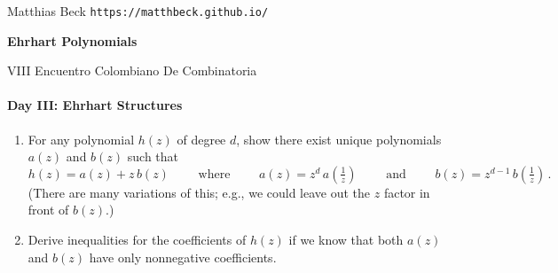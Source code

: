 \documentclass[11pt]{article}
\begin{document}

{\sc Matthias Beck} \hfill {\tt https://matthbeck.github.io/}


\newpage
\begin{center}
\Large{\bf Ehrhart Polynomials} 

\normalsize
VIII Encuentro Colombiano De Combinatoria
\end{center}

\paragraph{Day III: Ehrhart Structures}

\begin{enumerate}[(1)]
\vspace{-10pt}
\item For any polynomial $h(z)$ of degree $d$, show there exist unique polynomials $a(z)$ and $b(z)$ such that
\[
  h(z) = a(z) + z \, b(z)
  \qquad \text{ where } \qquad a(z) = z^d \, a(\tfrac 1 z) \qquad \text{ and } \qquad b(z) = z^{ d-1 } \, b(\tfrac 1 z) \, .
\]
(There are many variations of this; e.g., we could leave out the $z$ factor in front of $b(z)$.)

\item Derive inequalities for the coefficients of $h(z)$ if we know that both $a(z)$ and $b(z)$ have only nonnegative
coefficients.


\end{enumerate}
\end{document}
